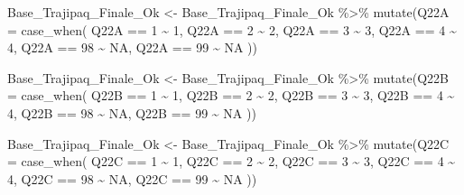 \documentclass[
]{article}
\newenvironment{Shaded}{\begin{snugshade}}{\end{snugshade}}
\newcommand{\AttributeTok}[1]{\textcolor[rgb]{0.77,0.63,0.00}{#1}}
\newcommand{\ConstantTok}[1]{\textcolor[rgb]{0.00,0.00,0.00}{#1}}
\newcommand{\DecValTok}[1]{\textcolor[rgb]{0.00,0.00,0.81}{#1}}
\newcommand{\FunctionTok}[1]{\textcolor[rgb]{0.00,0.00,0.00}{#1}}
\newcommand{\NormalTok}[1]{#1}
\newcommand{\OtherTok}[1]{\textcolor[rgb]{0.56,0.35,0.01}{#1}}
\newcommand{\SpecialCharTok}[1]{\textcolor[rgb]{0.00,0.00,0.00}{#1}}
\begin{document}
\begin{Shaded}
\begin{Highlighting}[]
\NormalTok{Base\_Trajipaq\_Finale\_Ok }\OtherTok{\textless{}{-}}
\NormalTok{  Base\_Trajipaq\_Finale\_Ok }\SpecialCharTok{\%\textgreater{}\%}
  \FunctionTok{mutate}\NormalTok{(}\AttributeTok{Q22A =} \FunctionTok{case\_when}\NormalTok{(}
\NormalTok{    Q22A }\SpecialCharTok{==} \DecValTok{1} \SpecialCharTok{\textasciitilde{}} \DecValTok{1}\NormalTok{,}
\NormalTok{    Q22A }\SpecialCharTok{==} \DecValTok{2} \SpecialCharTok{\textasciitilde{}} \DecValTok{2}\NormalTok{,}
\NormalTok{    Q22A }\SpecialCharTok{==} \DecValTok{3} \SpecialCharTok{\textasciitilde{}} \DecValTok{3}\NormalTok{,}
\NormalTok{    Q22A }\SpecialCharTok{==} \DecValTok{4} \SpecialCharTok{\textasciitilde{}} \DecValTok{4}\NormalTok{,}
\NormalTok{    Q22A }\SpecialCharTok{==} \DecValTok{98} \SpecialCharTok{\textasciitilde{}} \ConstantTok{NA}\NormalTok{,}
\NormalTok{    Q22A }\SpecialCharTok{==} \DecValTok{99} \SpecialCharTok{\textasciitilde{}} \ConstantTok{NA}
\NormalTok{  ))}

\NormalTok{Base\_Trajipaq\_Finale\_Ok }\OtherTok{\textless{}{-}}
\NormalTok{  Base\_Trajipaq\_Finale\_Ok }\SpecialCharTok{\%\textgreater{}\%}
  \FunctionTok{mutate}\NormalTok{(}\AttributeTok{Q22B =} \FunctionTok{case\_when}\NormalTok{(}
\NormalTok{    Q22B }\SpecialCharTok{==} \DecValTok{1} \SpecialCharTok{\textasciitilde{}} \DecValTok{1}\NormalTok{,}
\NormalTok{    Q22B }\SpecialCharTok{==} \DecValTok{2} \SpecialCharTok{\textasciitilde{}} \DecValTok{2}\NormalTok{,}
\NormalTok{    Q22B }\SpecialCharTok{==} \DecValTok{3} \SpecialCharTok{\textasciitilde{}} \DecValTok{3}\NormalTok{,}
\NormalTok{    Q22B }\SpecialCharTok{==} \DecValTok{4} \SpecialCharTok{\textasciitilde{}} \DecValTok{4}\NormalTok{,}
\NormalTok{    Q22B }\SpecialCharTok{==} \DecValTok{98} \SpecialCharTok{\textasciitilde{}} \ConstantTok{NA}\NormalTok{,}
\NormalTok{    Q22B }\SpecialCharTok{==} \DecValTok{99} \SpecialCharTok{\textasciitilde{}} \ConstantTok{NA}
\NormalTok{  ))}

\NormalTok{Base\_Trajipaq\_Finale\_Ok }\OtherTok{\textless{}{-}}
\NormalTok{  Base\_Trajipaq\_Finale\_Ok }\SpecialCharTok{\%\textgreater{}\%}
  \FunctionTok{mutate}\NormalTok{(}\AttributeTok{Q22C =} \FunctionTok{case\_when}\NormalTok{(}
\NormalTok{    Q22C }\SpecialCharTok{==} \DecValTok{1} \SpecialCharTok{\textasciitilde{}} \DecValTok{1}\NormalTok{,}
\NormalTok{    Q22C }\SpecialCharTok{==} \DecValTok{2} \SpecialCharTok{\textasciitilde{}} \DecValTok{2}\NormalTok{,}
\NormalTok{    Q22C }\SpecialCharTok{==} \DecValTok{3} \SpecialCharTok{\textasciitilde{}} \DecValTok{3}\NormalTok{,}
\NormalTok{    Q22C }\SpecialCharTok{==} \DecValTok{4} \SpecialCharTok{\textasciitilde{}} \DecValTok{4}\NormalTok{,}
\NormalTok{    Q22C }\SpecialCharTok{==} \DecValTok{98} \SpecialCharTok{\textasciitilde{}} \ConstantTok{NA}\NormalTok{,}
\NormalTok{    Q22C }\SpecialCharTok{==} \DecValTok{99} \SpecialCharTok{\textasciitilde{}} \ConstantTok{NA}
\NormalTok{  ))}


\end{Highlighting}
\end{Shaded}
\end{document}

